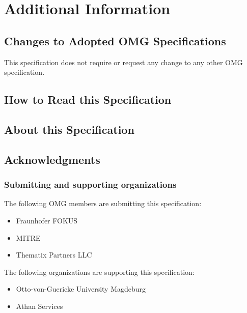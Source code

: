 \documentclass[10pt,%
\ifpretendfinal
final%
\else
draft%
\fi,
]{scrreprt}
\begin{document}
\chapter{Additional Information}
\section{Changes to Adopted OMG Specifications}
This specification does not require or request any change to any other OMG specification. 

\section{How to Read this Specification}

\section{About this Specification}

\section{Acknowledgments}
\subsection{Submitting and supporting organizations}
The following  OMG  members are submitting this specification:
	\begin{itemize}
		\item Fraunhofer FOKUS
		\item MITRE		
		\item Thematix Partners LLC
	\end{itemize}
The following organizations are supporting this specification: 
	\begin{itemize}
		\item Otto-von-Guericke University Magdeburg 
		\item Athan Services 
	\end{itemize}
\end{document}

